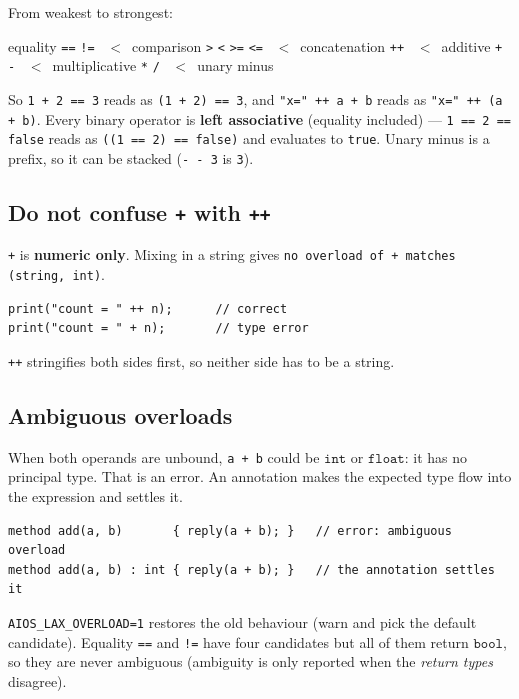 \documentclass[11pt,a4paper]{article}
\newcommand{\ty}[1]{\ensuremath{\mathtt{#1}}}
\begin{document}
From weakest to strongest:

\begin{center}
equality \texttt{==} \texttt{!=} \ $<$\ comparison \texttt{>} \texttt{<} \texttt{>=} \texttt{<=}
\ $<$\ concatenation \texttt{++} \ $<$\ additive \texttt{+} \texttt{-}
\ $<$\ multiplicative \texttt{*} \texttt{/} \ $<$\ unary minus
\end{center}

So \texttt{1 + 2 == 3} reads as \texttt{(1 + 2) == 3}, and
\texttt{"x=" ++ a + b} reads as \texttt{"x=" ++ (a + b)}.
Every binary operator is \textbf{left associative} (equality included) ---
\texttt{1 == 2 == false} reads as \texttt{((1 == 2) == false)} and evaluates to
\texttt{true}. Unary minus is a prefix, so it can be stacked
(\texttt{- - 3} is \texttt{3}).

\subsection{Do not confuse \texttt{+} with \texttt{++}}

\texttt{+} is \textbf{numeric only}. Mixing in a string gives
\texttt{no overload of + matches (string, int)}.

\begin{lstlisting}
print("count = " ++ n);      // correct
print("count = " + n);       // type error
\end{lstlisting}

\texttt{++} stringifies both sides first, so neither side has to be a string.

\subsection{Ambiguous overloads}

When both operands are unbound, \texttt{a + b} could be \ty{int} or
\ty{float}: it has no principal type. That is an error. An annotation makes the
expected type flow into the expression and settles it.

\begin{lstlisting}
method add(a, b)       { reply(a + b); }   // error: ambiguous overload
method add(a, b) : int { reply(a + b); }   // the annotation settles it
\end{lstlisting}

\texttt{AIOS\_LAX\_OVERLOAD=1} restores the old behaviour (warn and pick the
default candidate). Equality \texttt{==} and \texttt{!=} have four candidates
but all of them return \ty{bool}, so they are never ambiguous (ambiguity is
only reported when the \emph{return types} disagree).
\end{document}
